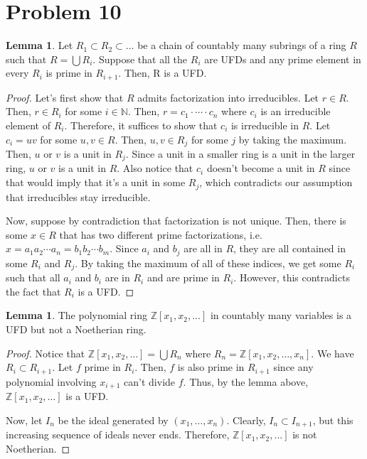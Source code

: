 \documentclass{article}
\theoremstyle{definition}
\newtheorem{lemma}[theorem]{Lemma}
\begin{document}
\newpage

\section{Problem 10}

\begin{lemma}
    Let $R_{1} \subset R_{2} \subset \ldots $  be a chain of countably many subrings of a ring $R$ such that $R = \bigcup R_{i}$. Suppose that all the $R_{i}$ are UFDs and any prime element in every $R_{i}$ is prime in $R_{i+1}$. Then, R is a UFD.
\end{lemma}
\begin{proof}
    Let's first show that $ R $ admits factorization into irreducibles.
    Let $r \in R$. Then, $r \in R_{i}$ for some $i \in \mathbb{N}$. Then, $r = c_{1} \cdot \cdots \cdot c_{n}$ where $c_{i}$ is an irreducible element of $R_{i}$. Therefore, it suffices to show that $c_{i}$ is irreducible in $R$. Let $c_{i} = uv$ for some $u,v \in R$. Then, $u,v \in R_{j}$ for some $j$ by taking the maximum. Then, $u$ or $v$ is a unit in $R_{j}$. Since a unit in a smaller ring is a unit in the larger ring, $u$ or $v$ is a unit in $R$. Also notice that $c_{i}$ doesn't become a unit in $R$ since that would imply that it's a unit in some $R_{j}$, which contradicts our assumption that irreducibles stay irreducible.


    Now, suppose by contradiction that factorization is not unique. Then, there is some $x \in R$ that has two different prime factorizations, i.e. $x = a_{1}a_{2} \cdots a_{n} = b_{1}b_{2} \cdots b_{m}$. Since $a_{i}$ and $b_{j}$ are all in $R$, they are all contained in some $R_{i}$ and $R_{j}$. By taking the maximum of all of these indices, we get some $R_{i}$ such that all $a_{i}$ and $b_{i}$ are in $R_{i}$ and are prime in $R_{i}$. However, this contradicts the fact that $R_{i}$ is a UFD.
\end{proof}

\begin{lemma}
    The polynomial ring $\mathbb{Z}[x_{1},x_{2},...]$ in countably many variables is a UFD but not a Noetherian ring.
\end{lemma}
\begin{proof}
    Notice that $\mathbb{Z}[x_{1},x_{2},...] = \bigcup R_{n}$ where $R_{n} = \mathbb{Z}[x_{1},x_{2}, \ldots ,x_{n}]$.
    We have $R_{i} \subset R_{i+1}$. 
    Let $ f $ prime in $R_{i}$.
    Then, $ f $ is also prime in $ R_{i + 1} $ since any polynomial involving $ x_{i + 1} $ can't divide $ f $.
    Thus, by the lemma above, $\mathbb{Z}[x_{1},x_{2}, \ldots] $ is a UFD.

    Now, let $I_{n}$ be the ideal generated by $(x_{1}, \ldots ,x_{n})$. Clearly, $I_{n} \subset I_{n+1}$, but this increasing sequence of ideals never ends. Therefore, $\mathbb{Z}[x_{1},x_{2},...]$ is not Noetherian.
\end{proof}
\end{document}
